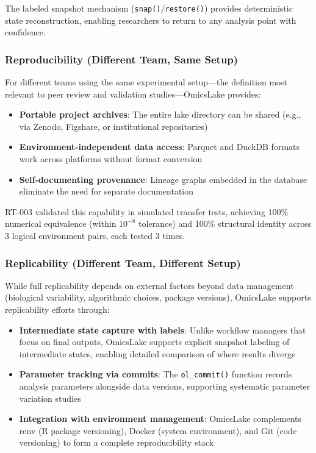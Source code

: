 \documentclass[11pt,a4paper]{article}
\begin{document}
The labeled snapshot mechanism (\texttt{snap()}/\texttt{restore()}) provides deterministic state reconstruction, enabling researchers to return to any analysis point with confidence.

\subsubsection{Reproducibility (Different Team, Same Setup)}

For different teams using the same experimental setup---the definition most relevant to peer review and validation studies---OmicsLake provides:

\begin{itemize}
    \item \textbf{Portable project archives}: The entire lake directory can be shared (e.g., via Zenodo, Figshare, or institutional repositories)
    \item \textbf{Environment-independent data access}: Parquet and DuckDB formats work across platforms without format conversion
    \item \textbf{Self-documenting provenance}: Lineage graphs embedded in the database eliminate the need for separate documentation
\end{itemize}

RT-003 validated this capability in simulated transfer tests, achieving 100\% numerical equivalence (within $10^{-8}$ tolerance) and 100\% structural identity across 3 logical environment pairs, each tested 3 times.

\subsubsection{Replicability (Different Team, Different Setup)}

While full replicability depends on external factors beyond data management (biological variability, algorithmic choices, package versions), OmicsLake supports replicability efforts through:

\begin{itemize}
    \item \textbf{Intermediate state capture with labels}: Unlike workflow managers that focus on final outputs, OmicsLake supports explicit snapshot labeling of intermediate states, enabling detailed comparison of where results diverge
    \item \textbf{Parameter tracking via commits}: The \texttt{ol\_commit()} function records analysis parameters alongside data versions, supporting systematic parameter variation studies
    \item \textbf{Integration with environment management}: OmicsLake complements renv (R package versioning), Docker (system environment), and Git (code versioning) to form a complete reproducibility stack
\end{itemize}
\end{document}
